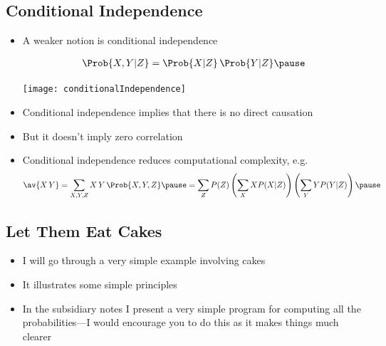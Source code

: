 
\begin{slide}
\section[-1]{Conditional Independence}

\begin{PauseHighLight}
  \begin{itemize}
  \item A weaker notion is conditional independence
    \begin{minipage}{0.68\linewidth}
      \begin{align*}
        \Prob{X,Y|Z} = \Prob{X|Z} \, \Prob{Y|Z}\pause
      \end{align*}
    \end{minipage}\hfil
    \begin{minipage}{0.18\linewidth}
      \begin{center}
        \texttt{[image: conditionalIndependence]}
      \end{center}
    \end{minipage}
  \item Conditional independence implies that there is no direct
    causation\pause
  \item But it doesn't imply zero correlation\pause
  \item Conditional independence reduces computational complexity, e.g.
    {\small \begin{align*}
      \av{X\,Y} = \sum_{X,Y,Z} X\,Y \, \Prob{X, Y, Z} \pause
      = \sum_Z P(Z) \left(\sum_X X P(X|Z) \right)  \left(\sum_Y Y P(Y|Z)
      \right)\pause
    \end{align*}}
  \end{itemize}
\end{PauseHighLight}

\end{slide}


\Outline %

\begin{slide}
\section{Let Them Eat Cakes}

\begin{PauseHighLight}
  \begin{itemize}
  \item I will go through a very simple example involving cakes\pause
  \item It illustrates some simple principles\pause
  \item In the subsidiary notes I present a very simple program for
    computing all the probabilities\pause---I would encourage you to
    do this as it makes things much clearer\pauseb
  \end{itemize}
\end{PauseHighLight}

\end{slide}

